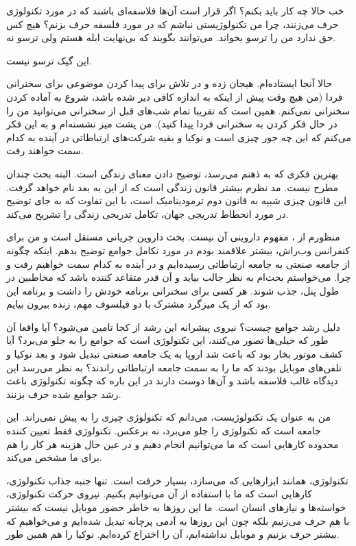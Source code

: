 خب حالا چه کار باید بکنم؟ اگر قرار است آن‌ها فلاسفه‌ای باشند که در مورد
تکنولوژی حرف می‌زنند، چرا من تکنولوژیستی نباشم که در مورد فلسفه حرف
بزنم؟ هیچ کس حق ندارد من را ترسو بخواند. می‌توانند بگویند که بی‌نهایت
ابله هستم ولی ترسو نه.

این گیک ترسو نیست.

حالا آنجا ایستاده‌ام. هیجان زده و در تلاش برای پیدا کردن موضوعی برای
سخنرانی فردا (من هیچ وقت پیش از اینکه به اندازه کافی دیر شده باشد،
شروع به آماده کردن سخنرانی نمی‌کنم. همین است که تقریبا تمام شب‌های قبل
از سخنرانی می‌توانید من را در حال فکر کردن به سخنرانی فردا پیدا
کنید). من پشت میز نشسته‌ام و به این فکر می‌کنم که این  چه جور چیزی است و نوکیا و بقیه شرکت‌های ارتباطاتی در آینده به
کدام سمت خواهند رفت.

بهترین فکری که به ذهنم می‌رسد، توضیح دادن معنای زندگی است. البته بحث
 چندان مطرح نیست. مد نظرم بیشتر قانون زندگی است که از
این به بعد  نام خواهد گرفت. این قانون چیزی شبیه
به قانون دوم ترمودینامیک است، با این تفاوت که به جای توضیح در مورد
انحطاط تدریجی جهان، تکامل تدریجی زندگی را تشریح می‌کند.

منظورم از ، مفهوم داروینی آن نیست. بحث داروین جریانی
مستقل است و من برای کنفرانس وب‌راش، بیشتر علاقمند بودم در مورد تکامل
جوامع توضیح بدهم. اینکه چگونه از جامعه صنعتی به جامعه ارتباطاتی
رسیده‌ایم و در آینده به کدام سمت خواهیم رفت و چرا. می‌خواستم بحث‌ام به
نظر جالب بیاید و آن قدر متقاعد کننده باشد که مخاطبین در طول پنل، جذب
شوند. هر کسی برای سخنرانی برنامه خودش را داشت و برنامه این بود که از
یک میزگرد مشترک با دو فیلسوف مهم، زنده بیرون بیایم.



دلیل رشد جوامع چیست؟ نیروی پیشرانه این رشد از کجا تامین می‌شود؟‌ آیا
واقعا آن طور که خیلی‌ها تصور می‌کنند، این تکنولوژی است که جوامع را به
جلو می‌برد؟ آیا کشف موتور بخار بود که باعث شد اروپا به یک جامعه صنعتی
تبدیل شود و بعد نوکیا و تلفن‌های موبایل بودند که ما را به سمت جامعه
ارتباطاتی راندند؟ به نظر می‌رسد این دیدگاه غالب فلاسفه باشد و آن‌ها دوست
دارند در این باره که چگونه تکنولوژی باعث رشد جوامع شده حرف بزنند.

من به عنوان یک تکنولوژیست، می‌دانم که تکنولوژی چیزی را به پیش
نمی‌راند. این جامعه است که تکنولوژی را جلو می‌برد، نه برعکس. تکنولوژی
فقط تعیین کننده محدوده کارهایی است که ما می‌توانیم انجام دهیم و در عین
حال هزینه هر کار را هم برای ما مشخص می‌کند.

تکنولوژی، همانند ابزارهایی که می‌سازد، بسیار خرفت است. تنها جنبه جذاب
تکنولوژی، کارهایی است که ما با استفاده از آن می‌توانیم بکنیم. نیروی
حرکت تکنولوژی، خواسته‌ها و نیازهای انسان است. ما این روزها به خاطر حضور
موبایل نیست که بیشتر با هم حرف می‌زنیم بلکه چون این روزها به آدمی
پرچانه تبدیل شده‌ایم و می‌خواهیم که بیشتر حرف بزنیم و موبایل نداشته‌ایم،
آن را اختراع کرده‌ایم. نوکیا را هم همین طور.


